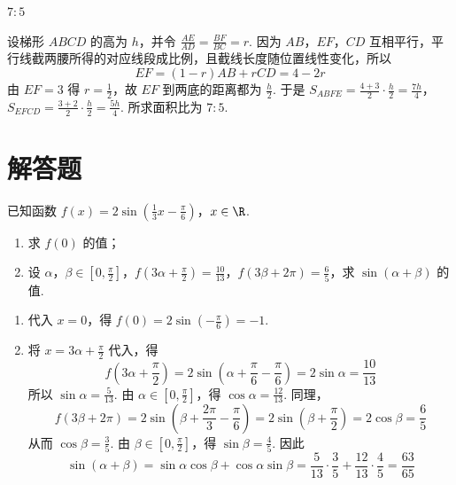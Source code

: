 \begin{answer}
\(7:5\)
\end{answer}

\begin{solution}
设梯形 \(ABCD\) 的高为 \(h\)，并令 \(\frac{AE}{AD}=\frac{BF}{BC}=r\). 因为 \(AB\)，\(EF\)，\(CD\) 互相平行，平行线截两腰所得的对应线段成比例，且截线长度随位置线性变化，所以
\[
EF=(1-r)AB+rCD=4-2r
\]
由 \(EF=3\) 得 \(r=\frac12\)，故 \(EF\) 到两底的距离都为 \(\frac h2\). 于是
\(S_{ABFE}=\frac{4+3}{2}\cdot\frac h2=\frac{7h}{4}\)，\(S_{EFCD}=\frac{3+2}{2}\cdot\frac h2=\frac{5h}{4}\).
所求面积比为 \(7:5\).
\end{solution}

\section{解答题}

\begin{problem}
已知函数 \(f(x) = 2\sin \left(\frac{1}{3} x - \frac{\pi}{6}\right)\)，\(x \in \R\).
\begin{enumerate}
\item 求 \( f(0) \) 的值；
\item 设 \(\alpha\)，\(\beta \in \left[0, \frac{\pi}{2}\right]\)，\(f\left(3\alpha + \frac{\pi}{2}\right) = \frac{10}{13}\)，\(f(3\beta + 2\pi) = \frac{6}{5}\)，求 \(\sin (\alpha + \beta)\) 的值.
\end{enumerate}
\end{problem}

\begin{solution}
\begin{enumerate}
\item 代入 \(x=0\)，得 \(f(0)=2\sin\left(-\frac\pi6\right)=-1\).
\item 将 \(x=3\alpha+\frac\pi2\) 代入，得
\[
f\left(3\alpha+\frac\pi2\right)=2\sin\left(\alpha+\frac\pi6-\frac\pi6\right)=2\sin\alpha=\frac{10}{13}
\]
所以 \(\sin\alpha=\frac5{13}\). 由 \(\alpha\in[0,\frac\pi2]\)，得 \(\cos\alpha=\frac{12}{13}\). 同理，
\[
f(3\beta+2\pi)=2\sin\left(\beta+\frac{2\pi}{3}-\frac\pi6\right)=2\sin\left(\beta+\frac\pi2\right)=2\cos\beta=\frac65
\]
从而 \(\cos\beta=\frac35\). 由 \(\beta\in[0,\frac\pi2]\)，得 \(\sin\beta=\frac45\). 因此
\[
\sin(\alpha+\beta)=\sin\alpha\cos\beta+\cos\alpha\sin\beta
 =\frac5{13}\cdot\frac35+\frac{12}{13}\cdot\frac45=\frac{63}{65}
\]
\end{enumerate}
\end{solution}

